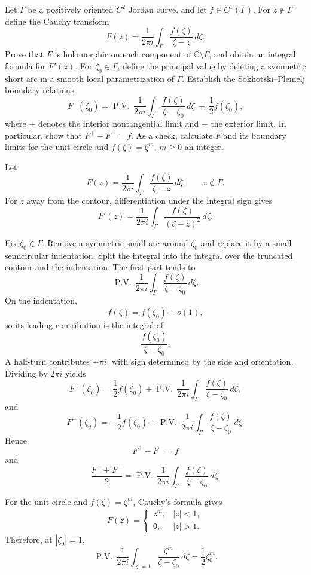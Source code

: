 \begin{problem}[CP-IV-0106]
\label{prob:cp-iv-0106}
Let $\Gamma$ be a positively oriented $C^2$ Jordan curve, and let
$f\in C^1(\Gamma)$. For $z\notin\Gamma$ define the Cauchy transform
\[
F(z)=\frac{1}{2\pi i}\int_\Gamma\frac{f(\zeta)}{\zeta-z}\,d\zeta.
\]
Prove that $F$ is holomorphic on each component of
$\mathbb C\setminus\Gamma$, and obtain an integral formula for $F'(z)$.
For $\zeta_0\in\Gamma$, define the principal value by deleting a
symmetric short arc in a smooth local parametrization of $\Gamma$.
Establish the Sokhotski--Plemelj boundary relations
\[
F^\pm(\zeta_0)=\operatorname{P.V.}\,\frac{1}{2\pi i}
\int_\Gamma\frac{f(\zeta)}{\zeta-\zeta_0}\,d\zeta
\ \pm\ \frac12 f(\zeta_0),
\]
where $+$ denotes the interior nontangential limit and $-$ the exterior
limit. In particular, show that $F^+-F^-=f$.
As a check, calculate $F$ and its boundary limits for the unit circle
and $f(\zeta)=\zeta^m$, $m\ge0$ an integer.
\end{problem}



\begin{solution}
Let
\[
F(z)=\frac{1}{2\pi i}\int_\Gamma
\frac{f(\zeta)}{\zeta-z}\,d\zeta,
\qquad z\notin\Gamma.
\]
For \(z\) away from the contour, differentiation under the integral sign gives
\[
F'(z)
=
\frac{1}{2\pi i}
\int_\Gamma
\frac{f(\zeta)}{(\zeta-z)^2}\,d\zeta.
\]

Fix \(\zeta_0\in\Gamma\). Remove a symmetric small arc around \(\zeta_0\) and replace it by a small semicircular indentation. Split the integral into the integral over the truncated contour and the indentation. The first part tends to
\[
\operatorname{P.V.}\,
\frac{1}{2\pi i}
\int_\Gamma
\frac{f(\zeta)}{\zeta-\zeta_0}\,d\zeta.
\]
On the indentation,
\[
f(\zeta)=f(\zeta_0)+o(1),
\]
so its leading contribution is the integral of
\[
\frac{f(\zeta_0)}{\zeta-\zeta_0}.
\]
A half-turn contributes \(\pm\pi i\), with sign determined by the side and orientation. Dividing by \(2\pi i\) yields
\[
F^+(\zeta_0)
=
\frac12f(\zeta_0)
+
\operatorname{P.V.}\,
\frac{1}{2\pi i}\int_\Gamma
\frac{f(\zeta)}{\zeta-\zeta_0}\,d\zeta,
\]
and
\[
F^-(\zeta_0)
=
-\frac12f(\zeta_0)
+
\operatorname{P.V.}\,
\frac{1}{2\pi i}\int_\Gamma
\frac{f(\zeta)}{\zeta-\zeta_0}\,d\zeta.
\]
Hence
\[
F^+-F^-=f
\]
and
\[
\frac{F^++F^-}{2}
=
\operatorname{P.V.}\,
\frac{1}{2\pi i}\int_\Gamma
\frac{f(\zeta)}{\zeta-\zeta_0}\,d\zeta.
\]

For the unit circle and \(f(\zeta)=\zeta^m\), Cauchy's formula gives
\[
F(z)=
\begin{cases}
z^m,&|z|<1,\\
0,&|z|>1.
\end{cases}
\]
Therefore, at \(|\zeta_0|=1\),
\[
\operatorname{P.V.}\,
\frac{1}{2\pi i}
\int_{|\zeta|=1}
\frac{\zeta^m}{\zeta-\zeta_0}\,d\zeta
=
\frac12\zeta_0^m.
\]
\end{solution}


